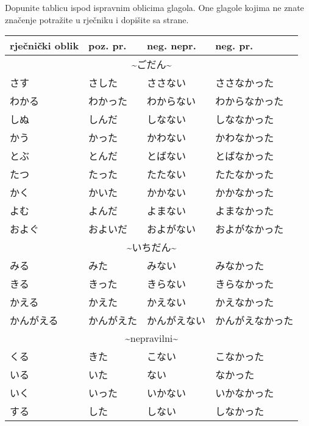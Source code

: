 
\author{Katja Kržišnik}

	\kaisetsu
		
	Dopunite tablicu ispod ispravnim oblicima glagola. One glagole kojima ne znate značenje potražite u rječniku i dopišite sa strane.
	
	\vspace{5pt}
	\begin{tabular}{|l|l|l|l|}
		\hline
		rječnički oblik & poz. pr. & neg. nepr. & neg. pr.\\
		\hline
		\multicolumn{4}{|c|}{\textasciitilde ごだん\textasciitilde}\\
		\hline
		さす&さした&ささない&ささなかった\\
		わかる&わかった&わからない&わからなかった\\
		しぬ&しんだ&しなない&しななかった\\
		かう&かった&かわない&かわなかった\\
		とぶ&とんだ&とばない&とばなかった\\
		たつ&たった&たたない&たたなかった\\
		かく&かいた&かかない&かかなかった\\
		よむ&よんだ&よまない&よまなかった\\
		およぐ&およいだ&およがない&およがなかった\\
		\hline
		\multicolumn{4}{|c|}{\textasciitilde いちだん\textasciitilde}\\
		\hline
		みる&みた&みない&みなかった\\
		きる&きった&きらない&きらなかった\\
		かえる&かえた&かえない&かえなかった\\
		かんがえる&かんがえた&かんがえない&かんがえなかった\\
		\hline
		\multicolumn{4}{|c|}{\textasciitilde nepravilni\textasciitilde}\\
		\hline
		くる&きた&こない&こなかった\\
		いる&いた&ない&なかった\\
		いく&いった&いかない&いかなかった\\
		する&した&しない&しなかった\\
		\hline
	\end{tabular}
	
	\newpage
	
